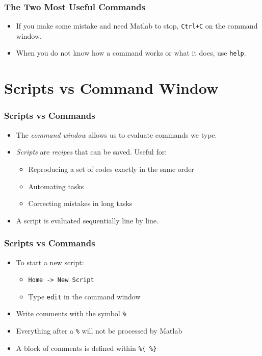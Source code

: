 \documentclass[11pt,xcolor={svgnames},aspectratio=169,usepdftitle=false]{beamer}
\begin{document}
\begin{frame}[fragile]
    \frametitle{The Two Most Useful Commands}
\begin{itemize}
    \item If you make some mistake and need Matlab to stop, \verb;Ctrl+C; on the command window.
    \item When you do not know how a command works or what it does, use \verb;help;.
\end{itemize}
\end{frame}

\section{Scripts vs Command Window}

\begin{frame}
    \frametitle{Scripts vs Commands}
\begin{itemize}
    \item The \alert{\textit{command window}} allows us to evaluate commands we type.
    \item \alert{\textit{Scripts}} are \textit{recipes} that can be saved. Useful for:
    \begin{itemize}
        \item Reproducing a set of codes \alert{exactly} in the same order
        \item Automating tasks
        \item Correcting mistakes in long tasks
    \end{itemize}
    \item A script is evaluated sequentially line by line.
\end{itemize}
\end{frame}

\begin{frame}[fragile]
    \frametitle{Scripts vs Commands}
    \begin{itemize}
        \item To start a new script:
        \begin{itemize}
            \item \verb;Home -> New Script;
            \item Type \verb;edit; in the command window
        \end{itemize}
        \item Write comments with the symbol \verb;%; 
        \item Everything after a \verb;%; will not be processed by Matlab
        \item A block of comments is defined within \verb;%{ %};
    \end{itemize}
\end{frame}
\end{document}

